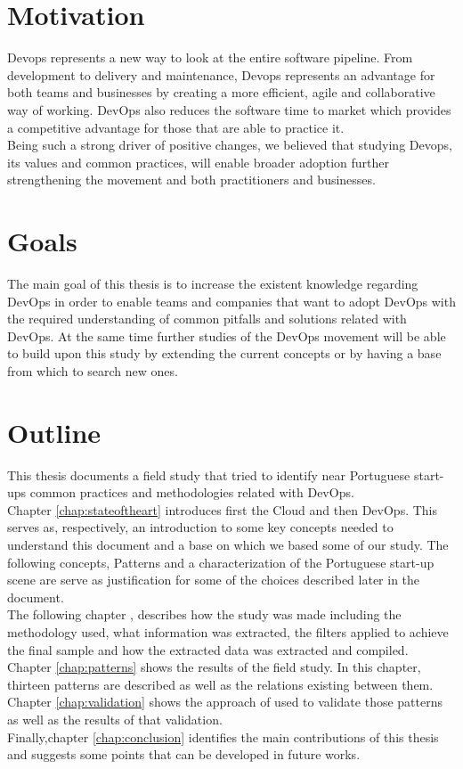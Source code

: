 		\section{Motivation} \label{chap:introduction:sec:motivation}
		Devops represents a new way to look at the entire software pipeline. From development to delivery and maintenance, Devops represents an advantage for both teams and businesses by creating a more efficient, agile and collaborative way of working. DevOps also reduces the software time to market which provides a competitive advantage for those that are able to practice it.\\
		Being such a strong driver of positive changes, we believed that studying Devops, its values and common practices, will enable broader adoption further strengthening the movement and both practitioners and businesses.

		\section{Goals}
		The main goal of this thesis is to increase the existent knowledge regarding DevOps in order to enable teams and companies that want to adopt DevOps with the required understanding of common pitfalls and solutions related with DevOps. At the same time further studies of the DevOps movement will be able to build upon this study by extending the current concepts or by having a base from which to search new ones.

  	\section{Outline} \label{chap:introduction:sec:outline}
		This thesis documents a field study that tried to identify near Portuguese start-ups common practices and methodologies related with DevOps. \\
		Chapter \ref{chap:stateoftheart} introduces first the Cloud and then DevOps. This serves as, respectively, an introduction to some key concepts needed to understand this document and a base on which we based some of our study. The following concepts, Patterns and a characterization of the Portuguese start-up scene are serve as justification for some of the choices described later in the document. \\
		The following chapter \label{chap:towardsdevops}, describes how the study was made including the methodology used, what information was extracted, the filters applied to achieve the final sample and how the extracted data was extracted and compiled. \\
		Chapter \ref{chap:patterns} shows the results of the field study. In this chapter, thirteen patterns are described as well as the relations existing between them.\\
		Chapter \ref{chap:validation} shows the approach of used to validate those patterns as well as the results of that validation.\\
		Finally,chapter \ref{chap:conclusion} identifies the main contributions of this thesis and suggests some points that can be developed in future works.
